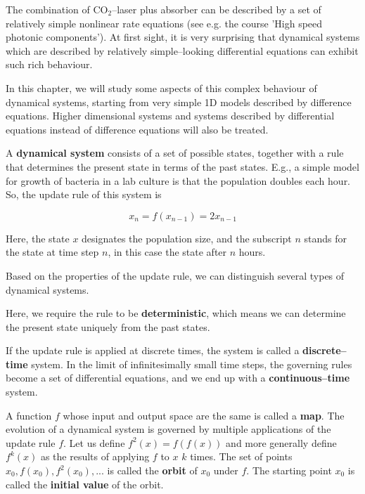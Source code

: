 The combination of CO$_2$--laser plus absorber can be described by a set of relatively simple nonlinear rate equations (see e.g. the course 'High speed photonic components'). At first sight, it is very surprising that dynamical systems which are described by relatively simple--looking differential equations can exhibit such rich behaviour.

In this chapter, we will study some aspects of this complex behaviour of dynamical systems, starting from very simple 1D models described by difference equations. Higher dimensional systems and systems described by differential equations instead of difference equations will also be treated.

\pagebreak



A \textbf{dynamical system} consists of a set of possible states, together with a rule that determines the present state in terms of the past states. E.g., a simple model for growth of bacteria in a lab culture is that the population doubles each hour. So, the update rule of this system is

\begin{equation}
x_n = f(x_{n-1}) = 2 x_{n-1} \label{eq-exp-growth}
\end{equation}

 Here, the state $x$ designates the population size, and the subscript $n$ stands for the state at time step $n$, in this case the state after $n$ hours.  

Based on the properties of the update rule, we can distinguish several types of dynamical systems.

Here, we require the rule to be \textbf{deterministic}, which means we can determine the present state uniquely from the past states.

If the update rule is applied at discrete times, the system is called a \textbf{discrete--time} system. In the limit of infinitesimally small time steps, the governing rules become a set of differential equations, and we end up with a \textbf{continuous--time} system.

\pagebreak


A function $f$ whose input and output space are the same is called a \textbf{map}. The evolution of a dynamical system is governed by multiple applications of the update rule $f$. Let us define $f^2(x)=f(f(x))$ and more generally define $f^k(x)$ as the results of applying $f$ to $x$ $k$ times. The set of points ${x_0, f(x_0), f^2(x_0), ...}$ is called the \textbf{orbit} of $x_0$ under $f$. The starting point $x_0$ is called the \textbf{initial value} of the orbit.

